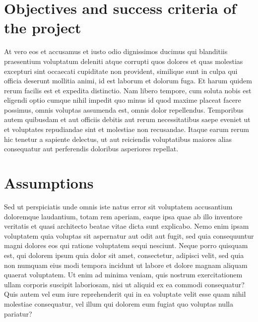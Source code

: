 \section{Objectives and success criteria of the project}
At vero eos et accusamus et iusto odio dignissimos ducimus qui blanditiis praesentium voluptatum deleniti atque corrupti 
quos dolores et quas molestias excepturi sint occaecati cupiditate non provident, similique sunt in culpa qui officia 
deserunt mollitia animi, id est laborum et dolorum fuga. Et harum quidem rerum facilis est et expedita distinctio. 
Nam libero tempore, cum soluta nobis est eligendi optio cumque nihil impedit quo minus id quod maxime placeat facere possimus, 
omnis voluptas assumenda est, omnis dolor repellendus. Temporibus autem quibusdam et aut officiis debitis aut rerum 
necessitatibus saepe eveniet ut et voluptates repudiandae sint et molestiae non recusandae. 
Itaque earum rerum hic tenetur a sapiente delectus, ut aut reiciendis voluptatibus maiores alias consequatur aut perferendis 
doloribus asperiores repellat.
\section{Assumptions}
Sed ut perspiciatis unde omnis iste natus error sit voluptatem accusantium doloremque laudantium, totam rem aperiam, 
eaque ipsa quae ab illo inventore veritatis et quasi architecto beatae vitae dicta sunt explicabo. 
Nemo enim ipsam voluptatem quia voluptas sit aspernatur aut odit aut fugit, sed quia consequuntur magni 
dolores eos qui ratione voluptatem sequi nesciunt. Neque porro quisquam est, qui dolorem ipsum quia dolor sit amet, 
consectetur, adipisci velit, sed quia non numquam eius modi tempora incidunt ut labore et dolore magnam aliquam quaerat voluptatem. 
Ut enim ad minima veniam, quis nostrum exercitationem ullam corporis suscipit laboriosam, nisi ut aliquid ex ea commodi consequatur? 
Quis autem vel eum iure reprehenderit qui in ea voluptate velit esse quam nihil molestiae consequatur, 
vel illum qui dolorem eum fugiat quo voluptas nulla pariatur?
